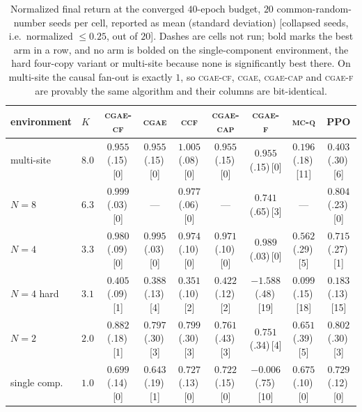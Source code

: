 \documentclass[review,authoryear,3p,times]{elsarticle}
\newcommand{\cgae}{\textsc{cgae}}              %
\newcommand{\cflow}{\textsc{cgae-cf}}          %
\newcommand{\cflowraw}{\textsc{cgae-f}}        %
\newcommand{\ccap}{\textsc{cgae-cap}}          %
\newcommand{\ccf}{\textsc{ccf}}
\newcommand{\mcq}{\textsc{mc-q}}
\begin{document}
\begin{table}[tbp]
\centering
\caption{Normalized final return at the converged $40$-epoch budget, $20$
common-random-number seeds per cell, reported as mean (standard deviation)
[collapsed seeds, i.e.\ normalized $\le0.25$, out of $20$]. Dashes are cells not
run; bold marks the best arm in a row, and no arm is bolded on the
single-component environment, the hard four-copy variant or multi-site because
none is significantly best there. On multi-site the causal fan-out is exactly
$1$, so \cflow, \cgae, \ccap{} and \cflowraw{} are provably the same algorithm
and their columns are bit-identical.}
\label{tab:main}
\small
\begin{tabular}{llccccccc}
\toprule
environment & $K$ & \cflow & \cgae & \ccf & \ccap & \cflowraw & \mcq & PPO \\
\midrule
multi-site   & $8.0$ & $0.955$ \tiny{(.15)\,[0]} & $0.955$ \tiny{(.15)\,[0]}
             & $1.005$ \tiny{(.08)\,[0]} & $0.955$ \tiny{(.15)\,[0]} & $0.955$ \tiny{(.15)\,[0]}
             & $0.196$ \tiny{(.18)\,[11]} & $0.403$ \tiny{(.30)\,[6]} \\
$N{=}8$      & $6.3$ & $\mathbf{0.999}$ \tiny{(.03)\,[0]} & ---
             & $0.977$ \tiny{(.06)\,[0]} & --- & $0.741$ \tiny{(.65)\,[3]}
             & --- & $0.804$ \tiny{(.23)\,[0]} \\
$N{=}4$      & $3.3$ & $0.980$ \tiny{(.09)\,[0]} & $\mathbf{0.995}$ \tiny{(.03)\,[0]}
             & $0.974$ \tiny{(.10)\,[0]} & $0.971$ \tiny{(.10)\,[0]} & $0.989$ \tiny{(.03)\,[0]}
             & $0.562$ \tiny{(.29)\,[5]} & $0.715$ \tiny{(.27)\,[1]} \\
$N{=}4$ hard & $3.1$ & $0.405$ \tiny{(.09)\,[1]} & $0.388$ \tiny{(.13)\,[4]}
             & $0.351$ \tiny{(.10)\,[2]} & $0.422$ \tiny{(.12)\,[2]} & $-1.588$ \tiny{(.48)\,[19]}
             & $0.099$ \tiny{(.15)\,[18]} & $0.183$ \tiny{(.13)\,[15]} \\
$N{=}2$      & $2.0$ & $\mathbf{0.882}$ \tiny{(.18)\,[1]} & $0.797$ \tiny{(.30)\,[3]}
             & $0.799$ \tiny{(.30)\,[3]} & $0.761$ \tiny{(.43)\,[3]} & $0.751$ \tiny{(.34)\,[4]}
             & $0.651$ \tiny{(.39)\,[5]} & $0.802$ \tiny{(.30)\,[3]} \\
single comp. & $1.0$ & $0.699$ \tiny{(.14)\,[0]} & $0.643$ \tiny{(.19)\,[1]}
             & $0.727$ \tiny{(.13)\,[0]} & $0.722$ \tiny{(.15)\,[0]} & $-0.006$ \tiny{(.75)\,[10]}
             & $0.675$ \tiny{(.10)\,[0]} & $0.729$ \tiny{(.12)\,[0]} \\
\bottomrule
\end{tabular}
\end{table}
\end{document}
